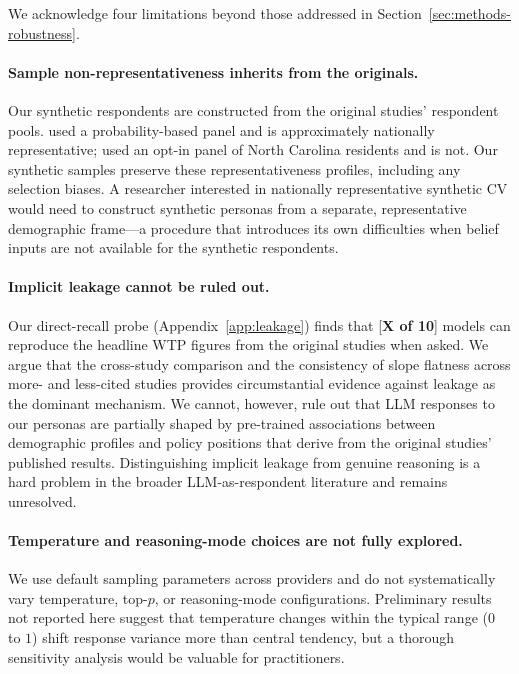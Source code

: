 \documentclass[12pt]{article}
\begin{document}
We acknowledge four limitations beyond those addressed in
Section~\ref{sec:methods-robustness}.

\paragraph{Sample non-representativeness inherits from the originals.}
Our synthetic respondents are constructed from the original studies'
respondent pools. \textcite{Aldy2012} used a probability-based panel
and is approximately nationally representative; \textcite{Giguere2020}
used an opt-in panel of North Carolina residents and is not. Our
synthetic samples preserve these representativeness profiles, including
any selection biases. A researcher interested in nationally
representative synthetic CV would need to construct synthetic personas
from a separate, representative demographic frame---a procedure that
introduces its own difficulties when belief inputs are not available
for the synthetic respondents.

\paragraph{Implicit leakage cannot be ruled out.} Our direct-recall
probe (Appendix~\ref{app:leakage}) finds that [\textbf{X of 10}] models
can reproduce the headline WTP figures from the original studies when
asked. We argue that the cross-study comparison and the consistency of
slope flatness across more- and less-cited studies provides
circumstantial evidence against leakage as the dominant mechanism. We
cannot, however, rule out that LLM responses to our personas are
partially shaped by pre-trained associations between demographic
profiles and policy positions that derive from the original studies'
published results. Distinguishing implicit leakage from genuine
reasoning is a hard problem in the broader LLM-as-respondent literature
and remains unresolved.

\paragraph{Temperature and reasoning-mode choices are not fully
explored.} We use default sampling parameters across providers and do
not systematically vary temperature, top-$p$, or reasoning-mode
configurations. Preliminary results not reported here suggest that
temperature changes within the typical range ($0$ to $1$) shift response
variance more than central tendency, but a thorough sensitivity analysis
would be valuable for practitioners.
\end{document}
